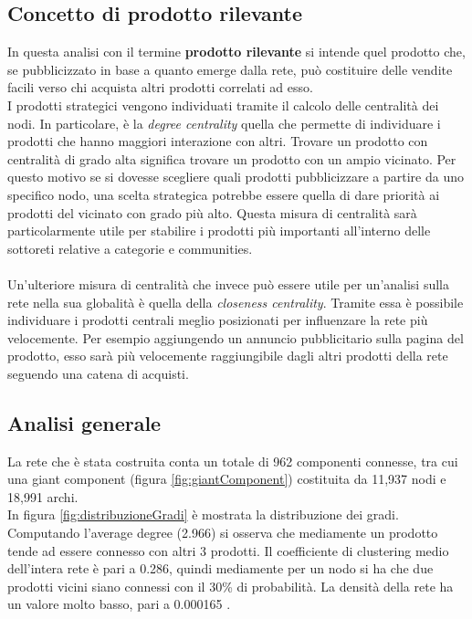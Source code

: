 \subsection{Concetto di prodotto rilevante}
In questa analisi con il termine \textbf{prodotto rilevante} si intende quel prodotto che, se pubblicizzato in base a quanto emerge dalla rete, può costituire delle vendite facili verso chi acquista altri prodotti correlati ad esso. \\
I prodotti strategici vengono individuati tramite il calcolo delle centralità dei nodi. In particolare, è la \textit{degree centrality} quella che permette di individuare i prodotti che hanno maggiori interazione con altri. Trovare un prodotto con centralità di grado alta significa trovare un prodotto con un ampio vicinato. Per questo motivo se si dovesse scegliere quali prodotti pubblicizzare a partire da uno specifico nodo, una scelta strategica potrebbe essere quella di dare priorità ai prodotti del vicinato con grado più alto. Questa misura di centralità sarà particolarmente utile per stabilire i prodotti più importanti all'interno delle sottoreti relative a categorie e communities. \\\\
Un'ulteriore misura di centralità che invece può essere utile per un'analisi sulla rete nella sua globalità è quella della \textit{closeness centrality}. Tramite essa è possibile individuare i prodotti centrali meglio posizionati per influenzare la rete più velocemente. Per esempio aggiungendo un annuncio pubblicitario sulla pagina del prodotto, esso sarà più velocemente raggiungibile dagli altri prodotti della rete seguendo una catena di acquisti.
   

\subsection{Analisi generale}
La rete che è stata costruita conta un totale di 962 componenti connesse, tra cui una giant component (figura \ref{fig:giantComponent}) costituita da 11,937 nodi e 18,991 archi. \\
In figura \ref{fig:distribuzioneGradi} è mostrata la distribuzione dei gradi. Computando l'average degree (2.966) si osserva che mediamente un prodotto tende ad essere connesso con altri 3 prodotti. Il coefficiente di clustering medio dell'intera rete è pari a 0.286, quindi mediamente per un nodo si ha che due prodotti vicini siano connessi con il 30\% di probabilità. La densità della rete ha un valore molto basso, pari a 0.000165 . \\\\

